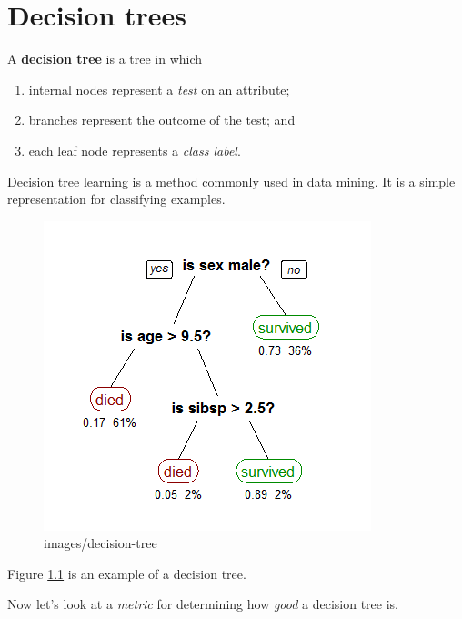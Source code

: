 \chapter{Decision trees}

\begin{definition}
    A \textbf{decision tree} is a tree in which
    \begin{enumerate}
        \item internal nodes represent a \emph{test} on an attribute; 
        \item branches represent the outcome of the test; and
        \item each leaf node represents a \emph{class label}.
    \end{enumerate}
\end{definition}

Decision tree learning is a method commonly used in data mining.
It is a simple representation for classifying examples.

\begin{figure}[]
    \centering
    \includegraphics[width=0.8\linewidth]{images/decision-tree}
    \caption{images/decision-tree}%
    \label{fig:decision-tree}
\end{figure}

\begin{example}
    Figure \ref{fig:decision-tree} is an example of a decision tree.
\end{example}

Now let's look at a \emph{metric} for determining how \emph{good} a decision tree is.

